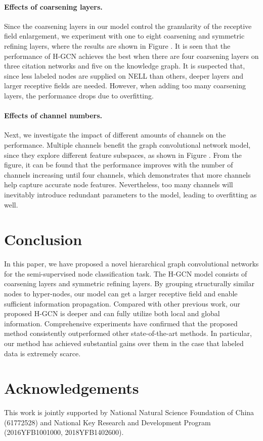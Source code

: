 \documentclass{article}
\begin{document}
\paragraph{Effects of coarsening layers.}
Since the coarsening layers in our model control the granularity of the receptive field enlargement, we experiment with one to eight coarsening and symmetric refining layers, where the results are shown in Figure . It is seen that the performance of H-GCN achieves the best when there are four coarsening layers on three citation networks and five on the knowledge graph. It is suspected that, since less labeled nodes are supplied on NELL than others, deeper layers and larger receptive fields are needed. However, when adding too many coarsening layers, the performance drops due to overfitting.

\paragraph{Effects of channel numbers.}
Next, we investigate the impact of different amounts of channels on the performance. Multiple channels benefit the graph convolutional network model, since they explore different feature subspaces, as shown in Figure . From the figure, it can be found that the performance improves with the number of channels increasing until four channels, which demonstrates that more channels help capture accurate node features. Nevertheless, too many channels will inevitably introduce redundant parameters to the model, leading to overfitting as well.
 \section{Conclusion}

In this paper, we have proposed a novel hierarchical graph convolutional networks for the semi-supervised node classification task. The H-GCN model consists of coarsening layers and symmetric refining layers. By grouping structurally similar nodes to hyper-nodes, our model can get a larger receptive field and enable sufficient information propagation. Compared with other previous work, our proposed H-GCN is deeper and can fully utilize both local and global information. Comprehensive experiments have confirmed that the proposed method consistently outperformed other state-of-the-art methods. In particular, our method has achieved substantial gains over them in the case that labeled data is extremely scarce.

\section*{Acknowledgements}

This work is jointly supported by National Natural Science Foundation of China (61772528) and National Key Research and Development Program (2016YFB1001000, 2018YFB1402600).
 


\end{document}

